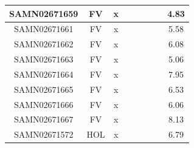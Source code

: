 \documentclass[../main.tex]{subfiles}
\begin{document}
\begin{flushleft}
\begin{footnotesize}
\begin{longtable}{|c|c|c|c|c|c|c|}
    \hline
    SAMN02671659  & FV    & x                                                            & ~          & ~                                                                           & ~                                                                 & 4.83      \\ 
    \hline
    SAMN02671661  & FV    & x                                                            & ~          & ~                                                                           & ~                                                                 & 5.58      \\ 
    \hline
    SAMN02671662  & FV    & x                                                            & ~          & ~                                                                           & ~                                                                 & 6.08      \\ 
    \hline
    SAMN02671663  & FV    & x                                                            & ~          & ~                                                                           & ~                                                                 & 5.06      \\ 
    \hline
    SAMN02671664  & FV    & x                                                            & ~          & ~                                                                           & ~                                                                 & 7.95      \\ 
    \hline
    SAMN02671665  & FV    & x                                                            & ~          & ~                                                                           & ~                                                                 & 6.53      \\ 
    \hline
    SAMN02671666  & FV    & x                                                            & ~          & ~                                                                           & ~                                                                 & 6.06      \\ 
    \hline
    SAMN02671667  & FV    & x                                                            & ~          & ~                                                                           & ~                                                                 & 8.13      \\ 
    \hline
    SAMN02671572  & HOL   & x                                                            & ~          & ~                                                                           & ~                                                                 & 6.79      \\ 

\end{longtable}
\end{footnotesize}
\end{flushleft}
\end{document}
